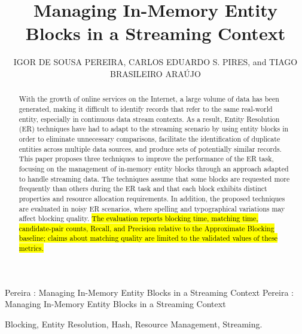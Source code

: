 \documentclass{ieeeaccess}
\begin{document}

\title{Managing In-Memory Entity Blocks in a Streaming Context}
\author{\uppercase{Igor de Sousa Pereira}, \uppercase{Carlos Eduardo S. Pires}, and \uppercase{Tiago Brasileiro Ara\'ujo}}

\address[1]{Department of Systems and Computing, Federal University of Campina Grande, Para\'iba, Brazil (e-mail: igor.pereira@copin.ufcg.edu.br; cesp@dsc.ufcg.edu.br)}
\address[2]{Federal Institute of Para\'iba, Soledade, Para\'iba, Brazil (e-mail: tiago.brasileiro@ifpb.edu.br)}

\markboth
{Pereira \headeretal: Managing In-Memory Entity Blocks in a Streaming Context}
{Pereira \headeretal: Managing In-Memory Entity Blocks in a Streaming Context}


\begin{abstract}
With the growth of online services on the Internet, a large volume of data has been generated, making it difficult to identify records that refer to the same real-world entity, especially in continuous data stream contexts. As a result, Entity Resolution (ER) techniques have had to adapt to the streaming scenario by using entity blocks in order to eliminate unnecessary comparisons, facilitate the identification of duplicate entities across multiple data sources, and produce sets of potentially similar records. This paper proposes three techniques to improve the performance of the ER task, focusing on the management of in-memory entity blocks through an approach adapted to handle streaming data. The techniques assume that some blocks are requested more frequently than others during the ER task and that each block exhibits distinct properties and resource allocation requirements. In addition, the proposed techniques are evaluated in noisy ER scenarios, where spelling and typographical variations may affect blocking quality. \hl{The evaluation reports blocking time, matching time, candidate-pair counts, Recall, and Precision relative to the Approximate Blocking baseline; claims about matching quality are limited to the validated values of these metrics.}
\end{abstract}

\begin{keywords}
Blocking, Entity Resolution, Hash, Resource Management, Streaming.
\end{keywords}
\end{document}
